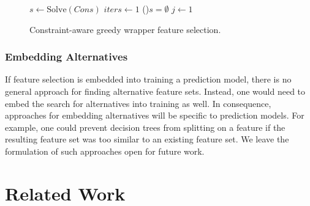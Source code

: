 \documentclass[conference]{IEEEtran}
\theoremstyle{definition}
\begin{document}
\begin{figure}[t]
\makeatletter
\let\@latex@error\@gobble
\makeatother
\begin{algorithm}[H]
	\DontPrintSemicolon
	\BlankLine
	$s \leftarrow \text{Solve}(Cons)$ 
	$iters \leftarrow 1$ 
	\If(){$s = \emptyset$}{
		\Return{$\emptyset$}
	}
	$j \leftarrow 1$ 
\end{algorithm}
\caption{Constraint-aware greedy wrapper feature selection.}
\label{al:greedy-wrapper}
\end{figure}

\subsubsection{Embedding Alternatives}
\label{sec:approach:objectives:embedding}

If feature selection is embedded into training a prediction model, there is no general approach for finding alternative feature sets.
Instead, one would need to embed the search for alternatives into training as well.
In consequence, approaches for embedding alternatives will be specific to prediction models.
For example, one could prevent decision trees from splitting on a feature if the resulting feature set was too similar to an existing feature set.
We leave the formulation of such approaches open for future work.

\section{Related Work}
\label{sec:related-work}
\end{document}
